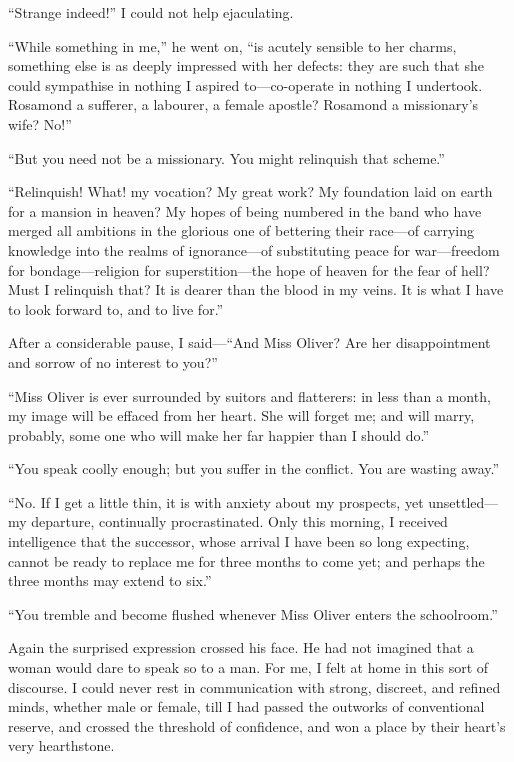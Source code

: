 \enquote{Strange indeed!} I could not help ejaculating.

\enquote{While something in me,} he went on, \enquote{is acutely
sensible to her charms, something else is as deeply impressed with her
defects: they are such that she could sympathise in nothing I aspired
to---co-operate in nothing I undertook. Rosamond a sufferer, a
labourer, a female apostle? Rosamond a missionary's wife? No!}

\enquote{But you need not be a missionary. You might relinquish that
scheme.}

\enquote{Relinquish! What! my vocation? My great work? My foundation
laid on earth for a mansion in heaven? My hopes of being numbered in
the band who have merged all ambitions in the glorious one of bettering
their race---of carrying knowledge into the realms of ignorance---of
substituting peace for war---freedom for bondage---religion for
superstition---the hope of heaven for the fear of hell? Must I
relinquish that? It is dearer than the blood in my veins. It is what I
have to look forward to, and to live for.}

After a considerable pause, I said---\enquote{And Miss Oliver? Are her
disappointment and sorrow of no interest to you?}

\enquote{Miss Oliver is ever surrounded by suitors and flatterers: in
less than a month, my image will be effaced from her heart. She will
forget me; and will marry, probably, some one who will make her far
happier than I should do.}

\enquote{You speak coolly enough; but you suffer in the conflict. You
are wasting away.}

\enquote{No. If I get a little thin, it is with anxiety about my
prospects, yet unsettled---my departure, continually procrastinated. 
Only this morning, I received intelligence that the successor, whose
arrival I have been so long expecting, cannot be ready to replace me for
three months to come yet; and perhaps the three months may extend to
six.}

\enquote{You tremble and become flushed whenever Miss Oliver enters the
schoolroom.}

Again the surprised expression crossed his face. He had not imagined
that a woman would dare to speak so to a man. For me, I felt at home in
this sort of discourse. I could never rest in communication with
strong, discreet, and refined minds, whether male or female, till I had
passed the outworks of conventional reserve, and crossed the threshold
of confidence, and won a place by their heart's very hearthstone.


